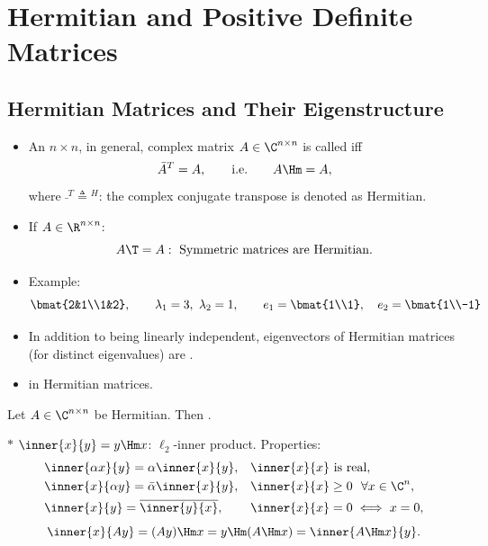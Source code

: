 \section{Hermitian and Positive Definite Matrices}\label{sec:hermitian}

\subsection{Hermitian Matrices and Their Eigenstructure}\label{ss:hermitian-props}

\begin{itemize}[label=$\ast$]
\item\leavevmode{}An $n\times n$, in general, complex matrix $A\in\C^{n\times n}$ is called  iff
\[
\bar A^{T}=A, \qquad\text{i.e.}\qquad A\Hm=A,
\]
where $\bar{\ }^{T}\triangleq{}^{H}$: the complex conjugate transpose is denoted as Hermitian.
\item If $A\in\R^{n\times n}$:
\[
A\T=A:\ \text{Symmetric matrices are Hermitian.}
\]
\item Example:
\[
\bmat{2&1\\1&2},\qquad \lambda_1=3,\ \lambda_2=1,\qquad e_1=\bmat{1\\1},\quad e_2=\bmat{1\\-1}
\]
\item In addition to being linearly independent, eigenvectors of Hermitian matrices (for distinct eigenvalues) are .
\item {} in Hermitian matrices.
\end{itemize}

\begin{theorem}
Let $A\in\C^{n\times n}$ be Hermitian. Then .
\end{theorem}

$\ast$ $\inner{x}{y}=y\Hm x$: $\ell_2$-inner product. Properties:
\begin{align*}
&\inner{\alpha x}{y}=\alpha\inner{x}{y}, & &\inner{x}{x}\text{ is real},\\
&\inner{x}{\alpha y}=\bar\alpha\inner{x}{y}, & &\inner{x}{x}\geq0\ \ \forall x\in\C^n,\\
&\inner{x}{y}=\overline{\inner{y}{x}}, & &\inner{x}{x}=0\iff x=0,
\end{align*}
\[
\inner{x}{Ay}=(Ay)\Hm x=y\Hm(A\Hm x)=\inner{A\Hm x}{y}.
\]


